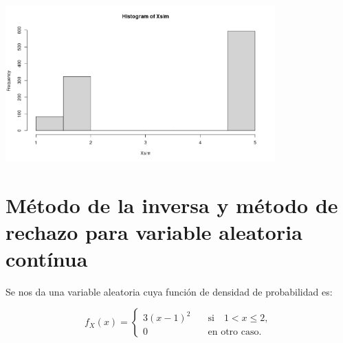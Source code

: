 \documentclass[11pt,letterpaper]{article}
\begin{document}
\begin{itemize}
		\includegraphics[height=6cm]{hist_10_5.png}
		
	\end{itemize}

	\section{Método de la inversa y método de rechazo para variable aleatoria contínua}
	
	Se nos da una variable aleatoria cuya función de densidad de probabilidad es:
	
	\[
	f_X(x) = 
	\begin{cases}
		3(x-1)^2 &\quad\text{si}\quad 1 < x \leq 2, \\
		0        &\quad\text{en otro caso.}
	\end{cases}
	\]
	
\end{document}
